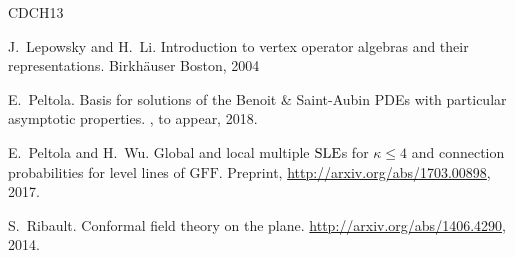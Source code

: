 \documentclass[oneside,english]{amsart}
\numberwithin{equation}{section}
\numberwithin{figure}{section}
\theoremstyle{plain}
\theoremstyle{plain}
\theoremstyle{plain}
\theoremstyle{remark}
\theoremstyle{plain}
\theoremstyle{plain}
\theoremstyle{plain}
\theoremstyle{plain}
\theoremstyle{plain}
\theoremstyle{plain}
\theoremstyle{plain}
\theoremstyle{plain}
\begin{document}
\begin{thebibliography}{CDCH{\etalchar{+}}13}

J.~Lepowsky and H.~Li.
\newblock Introduction to vertex operator algebras and their representations.
\newblock Birkh\"auser Boston, 2004




E.~Peltola.
\newblock Basis for solutions of the Benoit \& Saint-Aubin PDEs with particular asymptotic properties.
, to appear, 2018.

E.~Peltola and H.~Wu. 
\newblock Global and local multiple $\mathrm{SLE}$s for $\kappa \leq 4$ and connection probabilities for level lines of $\mathrm{GFF}$.
\newblock Preprint, \url{http://arxiv.org/abs/1703.00898}, 2017.



S.~Ribault.
\newblock Conformal field theory on the plane.
\newblock \url{http://arxiv.org/abs/1406.4290}, 2014.


\end{thebibliography}
\end{document}
